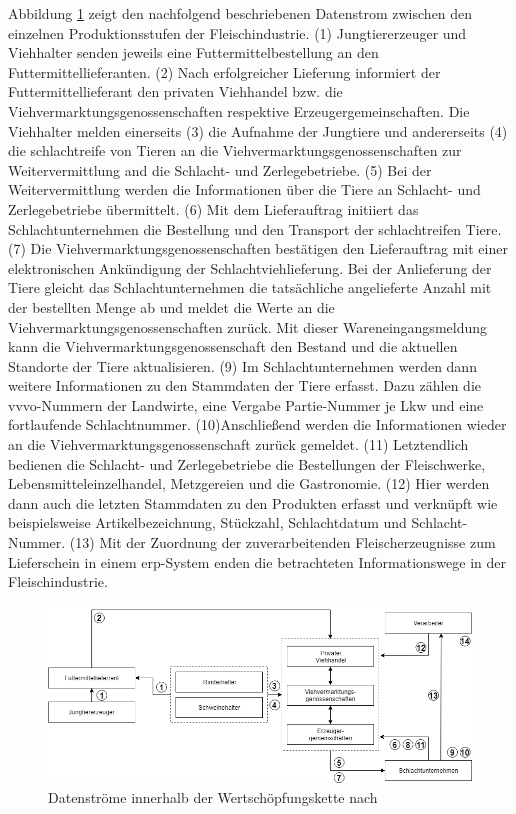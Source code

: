 Abbildung \ref{fig:data-stream-meat-industry} zeigt den nachfolgend beschriebenen Datenstrom zwischen den einzelnen Produktionsstufen der Fleischindustrie. (1) Jungtiererzeuger und Viehhalter senden jeweils eine Futtermittelbestellung an den Futtermittellieferanten. (2) Nach erfolgreicher Lieferung informiert der Futtermittellieferant den privaten Viehhandel bzw. die Viehvermarktungsgenossenschaften respektive Erzeugergemeinschaften. Die Viehhalter melden einerseits (3) die Aufnahme der Jungtiere und andererseits (4) die schlachtreife von Tieren an die Viehvermarktungsgenossenschaften zur Weitervermittlung and die Schlacht- und Zerlegebetriebe. (5) Bei der Weitervermittlung werden die Informationen über die Tiere an Schlacht- und Zerlegebetriebe übermittelt. (6) Mit dem Lieferauftrag initiiert das Schlachtunternehmen die Bestellung und den Transport der schlachtreifen Tiere. (7) Die Viehvermarktungsgenossenschaften bestätigen den Lieferauftrag mit einer elektronischen Ankündigung der Schlachtviehlieferung. Bei der Anlieferung der Tiere gleicht das Schlachtunternehmen die tatsächliche angelieferte Anzahl mit der bestellten Menge ab und meldet die Werte an die Viehvermarktungsgenossenschaften zurück. Mit dieser Wareneingangsmeldung kann die Viehvermarktungsgenossenschaft den Bestand und die aktuellen Standorte der Tiere aktualisieren. (9) Im Schlachtunternehmen werden dann weitere Informationen zu den Stammdaten der Tiere erfasst. Dazu zählen die \ac{vvvo}-Nummern der Landwirte, eine Vergabe Partie-Nummer je Lkw und eine fortlaufende Schlachtnummer. (10)Anschließend werden die Informationen wieder an die Viehvermarktungsgenossenschaft zurück gemeldet. (11) Letztendlich bedienen die Schlacht- und Zerlegebetriebe die Bestellungen der Fleischwerke, Lebensmitteleinzelhandel, Metzgereien und die Gastronomie. (12) Hier werden dann auch die letzten Stammdaten zu den Produkten erfasst und verknüpft wie beispielsweise Artikelbezeichnung, Stückzahl, Schlachtdatum und Schlacht-Nummer. (13) Mit der Zuordnung der zuverarbeitenden Fleischerzeugnisse zum Lieferschein in einem \ac{erp}-System enden die betrachteten Informationswege in der Fleischindustrie.

\begin{figure}[H]
	\centering
	\includegraphics[width=1\linewidth]{pictures/data-stream-meat-industry-numbered}
	\caption[Datenströme innerhalb der Wertschöpfungskette]{Datenströme innerhalb der Wertschöpfungskette nach \citet{Petersen2010, Voss2010, Beck2008}}
	\label{fig:data-stream-meat-industry}
\end{figure}

